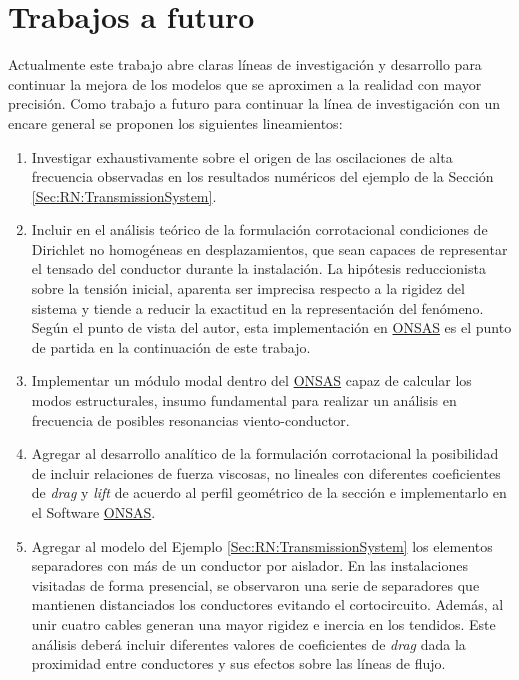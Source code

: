 \section{Trabajos a futuro}

Actualmente este trabajo abre claras líneas de investigación y desarrollo para continuar la mejora de los modelos que se aproximen a la realidad con mayor precisión. Como trabajo a futuro para continuar la línea de investigación con un encare general se proponen los siguientes lineamientos:

\begin{enumerate}
	\item Investigar exhaustivamente sobre el origen de las oscilaciones de alta frecuencia observadas en los resultados numéricos del ejemplo de la Sección \ref{Sec:RN:TransmissionSystem}.
	\item Incluir en el análisis teórico de la formulación corrotacional condiciones de Dirichlet no homogéneas en desplazamientos, que sean capaces de representar el tensado del conductor durante la instalación. La hipótesis reduccionista sobre la tensión inicial, aparenta ser imprecisa respecto a la rigidez del sistema y tiende a reducir la exactitud en la representación del fenómeno. Según el punto de vista del autor, esta implementación en \href{https://github.com/ONSAS/ONSAS.m/}{ONSAS} es el punto de partida en la continuación de este trabajo. 
	\item Implementar un módulo modal dentro del \href{https://github.com/ONSAS/ONSAS.m/}{ONSAS} capaz de calcular los modos estructurales, insumo fundamental para realizar un análisis en frecuencia de posibles resonancias viento-conductor.
	\item Agregar al desarrollo analítico de la formulación corrotacional la posibilidad de incluir relaciones de fuerza viscosas, no lineales con diferentes coeficientes de \textit{drag} y \textit{lift} de acuerdo al perfil geométrico de la sección e implementarlo en el Software \href{https://github.com/ONSAS/ONSAS.m/}{ONSAS}.
	\item Agregar al modelo del Ejemplo \ref{Sec:RN:TransmissionSystem} los elementos separadores con más de un conductor por aislador. En las instalaciones visitadas de forma presencial, se observaron una serie de separadores que mantienen distanciados los conductores evitando el cortocircuito. Además, al unir cuatro cables generan una mayor rigidez e inercia en los tendidos. Este análisis deberá incluir diferentes valores de coeficientes de \textit{drag} dada la proximidad entre conductores y sus efectos sobre las líneas de flujo.  

\end{enumerate}
